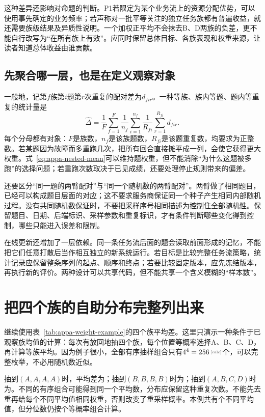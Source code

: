 这种差异还影响对命题的判断。P1若限定为某个业务流上的资源分配优势，可以使用事先确定的业务频率；若声称对一批平等关注的独立任务族都有普遍收益，就还需要族级结果及异质性说明。一个加权正平均不会抹去B、D两族的负差，更不能自行改写为“在所有族上有效”。应同时保留总体目标、各族表现和权重来源，让读者知道总体收益由谁贡献。

\subsection{先聚合哪一层，也是在定义观察对象}

一般地，记第$f$族第$i$题第$r$次重复的配对差为$d_{fir}$。一种等族、族内等题、题内等重复的统计量是
\begin{equation}
 \widehat\Delta
 =\frac{1}{F}\sum_{f=1}^{F}\frac{1}{n_f}
  \sum_{i=1}^{n_f}\frac{1}{R_{fi}}\sum_{r=1}^{R_{fi}}d_{fir}.
 \label{eq:appa-nested-mean}
\end{equation}
每个分母都有对象：$F$是族数，$n_f$是该族题数，$R_{fi}$是该题重复数，均要求为正整数。若某题因为故障而多重跑几次，把所有回合直接摊平成一列，会使它获得更大权重。式~\eqref{eq:appa-nested-mean}可以维持题权重，但不能消除“为什么这题被多跑”的选择问题；若重跑次数取决于已见成绩，还要处理停止规则带来的偏差。

还要区分“同一题的两臂配对”与“同一个随机数的两臂配对”。两臂做了相同题目，已经可以构成题目层面的对应；这不要求服务商保证同一个种子产生相同内部随机过程。没有共同随机数保证时，不要把采样序号相同描述为控制住全部随机性。保留题目、日期、后端标识、采样参数和重复标识，才有条件判断哪些变化得到控制，哪些只能进入误差和限制。

在线更新还增加了一层依赖。同一条任务流后面的题会读取前面形成的记忆，不能把它们任意打散后当作相互独立的新系统运行。若目标是比较完整任务流策略，统计记录应保留整条序列的起点、顺序和终点；若要比较固定版本，应先冻结版本，再执行新的评价。两种设计可以共享代码，但不能共享一个含义模糊的“样本数”。

\section{把四个族的自助分布完整列出来}

继续使用表~\ref{tab:appa-weight-example}的四个族平均差。这里只演示一种条件于已观察族均值的计算：每次有放回地抽四个族，每个位置等概率选择A、B、C、D，再计算等族平均。因为例子很小，全部有序抽样组合只有$4^4=\calcnum{256}$个，可以完整枚举，不必用随机数近似。

抽到$(A,A,A,A)$时，平均差为；抽到$(B,B,B,B)$时为；抽到$(A,B,C,D)$时为。不同的有序组合可能得到同一个平均数，分布应保留这种重复次数。不能先去重再给每个不同平均值相同权重，否则改变了重采样概率。本例共有个不同平均值，但分位数仍按个等概率组合计算。


